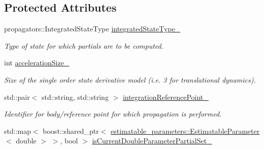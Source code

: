 \subsection*{Protected Attributes}
\begin{DoxyCompactItemize}
\item 
propagators\+::\+Integrated\+State\+Type \hyperlink{classtudat_1_1orbit__determination_1_1StateDerivativePartial_aad4f9e664da456462d4cb8b764679f1f}{integrated\+State\+Type\+\_\+}\hypertarget{classtudat_1_1orbit__determination_1_1StateDerivativePartial_aad4f9e664da456462d4cb8b764679f1f}{}\label{classtudat_1_1orbit__determination_1_1StateDerivativePartial_aad4f9e664da456462d4cb8b764679f1f}

\begin{DoxyCompactList}\small\item\em Type of state for which partials are to be computed. \end{DoxyCompactList}\item 
int \hyperlink{classtudat_1_1orbit__determination_1_1StateDerivativePartial_aacaaf221e1d39de40b6d9e3b881b9e42}{acceleration\+Size\+\_\+}\hypertarget{classtudat_1_1orbit__determination_1_1StateDerivativePartial_aacaaf221e1d39de40b6d9e3b881b9e42}{}\label{classtudat_1_1orbit__determination_1_1StateDerivativePartial_aacaaf221e1d39de40b6d9e3b881b9e42}

\begin{DoxyCompactList}\small\item\em Size of the single order state derivative model (i.\+e. 3 for translational dynamics). \end{DoxyCompactList}\item 
std\+::pair$<$ std\+::string, std\+::string $>$ \hyperlink{classtudat_1_1orbit__determination_1_1StateDerivativePartial_a0c30598298c59647e997203dc0ad664c}{integration\+Reference\+Point\+\_\+}
\begin{DoxyCompactList}\small\item\em Identifier for body/reference point for which propagation is performed. \end{DoxyCompactList}\item 
std\+::map$<$ boost\+::shared\+\_\+ptr$<$ \hyperlink{classtudat_1_1estimatable__parameters_1_1EstimatableParameter}{estimatable\+\_\+parameters\+::\+Estimatable\+Parameter}$<$ double $>$ $>$, bool $>$ \hyperlink{classtudat_1_1orbit__determination_1_1StateDerivativePartial_a64559976ad324e05905c233752d197b0}{is\+Current\+Double\+Parameter\+Partial\+Set\+\_\+}\hypertarget{classtudat_1_1orbit__determination_1_1StateDerivativePartial_a64559976ad324e05905c233752d197b0}{}\label{classtudat_1_1orbit__determination_1_1StateDerivativePartial_a64559976ad324e05905c233752d197b0}


\end{DoxyCompactItemize}
